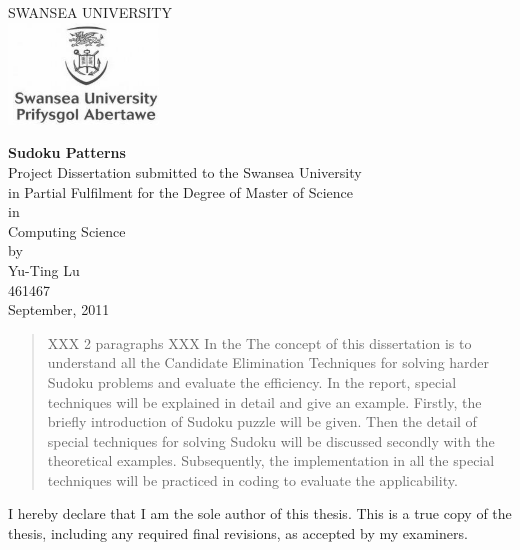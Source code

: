 \documentclass[11pt]{report}
\begin{document}
\begin{titlepage}
\centering
\LARGE SWANSEA UNIVERSITY\\ \vspace{40pt}
\includegraphics[width=0.3\textwidth]{./logo}\\ \vspace{50pt}

\Huge \textbf{Sudoku Patterns}\\ \vspace{70pt}
\Large Project Dissertation submitted to the Swansea University\\ \vspace{6pt}
in Partial Fulfilment for the Degree of Master of Science\\ \vspace{6pt}
\large in\\ \vspace{12pt}
Computing Science\\ \vspace{60pt}
\large by\\ \bigskip
Yu-Ting Lu\\ \vspace{6pt}
461467 \\ \vspace{30pt}
September, 2011\\ \vspace{12pt}
\end{titlepage}


\begin{abstract}
  XXX 2 paragraphs XXX
In the The concept of this dissertation is to understand all the Candidate Elimination Techniques for solving harder Sudoku problems and evaluate the efficiency. In the report, special techniques will be explained in detail and give an example.
Firstly, the briefly introduction of Sudoku puzzle will be given. Then the detail of special techniques for solving Sudoku will be discussed secondly with the theoretical examples.
Subsequently, the implementation in all the special techniques will be practiced in coding to evaluate the applicability.
\end{abstract}

I hereby declare that I am the sole author of this thesis. This is a true copy of the thesis, including any required final revisions, as accepted by my examiners.
\end{document}
